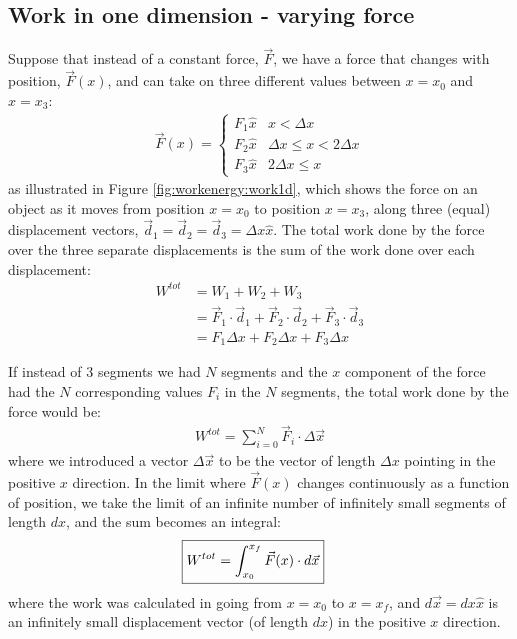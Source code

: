 \subsection{Work in one dimension - varying force}
Suppose that instead of a constant force, $\vec F$, we have a force that changes with position, $\vec F(x)$, and can take on three different values between $x=x_0$ and $x=x_3$:
\begin{align*}
  \vec F (x)=
  \begin{cases}
    F_1\hat x & x<\Delta x \\
    F_2\hat x & \Delta x \leq x< 2\Delta x \\
    F_3\hat x & 2\Delta x \leq x
  \end{cases}
\end{align*}
as illustrated in Figure \ref{fig:workenergy:work1d}, which shows the force on an object as it moves from position $x=x_0$ to position $x=x_3$, along three (equal) displacement vectors, $\vec d_1=\vec d_2=\vec d_3=\Delta x \hat x$. 
The total work done by the force over the three separate displacements is the sum of the work done over each displacement:
\begin{align*}
W^{tot}&=W_1+W_2+W_3\\
&=\vec F_1\cdot \vec d_1+\vec F_2\cdot \vec d_2+\vec F_3\cdot \vec d_3\\
&= F_1\Delta x +F_2\Delta x + F_3\Delta x
\end{align*} 

If instead of 3 segments we had $N$ segments and the $x$ component of the force had the $N$ corresponding values $F_i$ in the $N$ segments, the total work done by the force would be:
\begin{align*}
W^{tot} = \sum_{i=0}^N\vec F_i \cdot \Delta \vec x
\end{align*}
where we introduced a vector $\Delta \vec x$ to be the vector of length $\Delta x$ pointing in the positive $x$ direction. In the limit where $\vec F(x)$ changes continuously as a function of position, we take the limit of an infinite number of infinitely small segments of length $dx$, and the sum becomes an integral:
\begin{align}
\Aboxed{W^{tot} = \int_{x_0}^{x_f}\vec F(x) \cdot d\vec x}
\end{align}
where the work was calculated in going from $x=x_0$ to $x=x_f$, and $d\vec x=dx\hat x$ is an infinitely small displacement vector (of length $dx$) in the positive $x$ direction.

